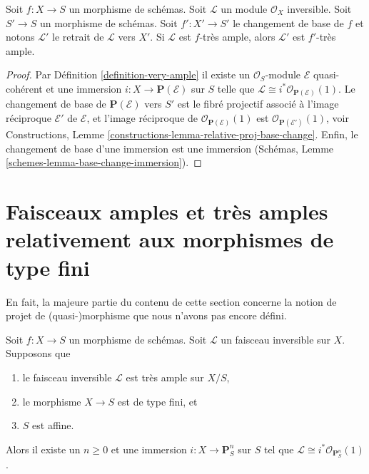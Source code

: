 \begin{lemma}
\label{lemma-very-ample-base-change}
Soit $f : X \to S$ un morphisme de schémas. Soit
$\mathcal{L}$ un module $\mathcal{O}_X$ inversible. Soit $S' \to S$
un morphisme de schémas. Soit $f' : X' \to S'$
le changement de base de $f$ et notons $\mathcal{L}'$
le retrait de $\mathcal{L}$ vers $X'$. Si $\mathcal{L}$
est $f$-très ample, alors $\mathcal{L}'$ est $f'$-très ample.
\end{lemma}

\begin{proof}
Par Définition \ref{definition-very-ample} il existe un $\mathcal{O}_S$-module
$\mathcal{E}$ quasi-cohérent et une
immersion $i : X \to \mathbf{P}(\mathcal{E})$ sur $S$
telle que $\mathcal{L} \cong i^*\mathcal{O}_{\mathbf{P}(\mathcal{E})}(1)$. Le changement de
base de $\mathbf{P}(\mathcal{E})$ vers $S'$
est le fibré projectif associé à l'image réciproque
$\mathcal{E}'$ de $\mathcal{E}$,
et l'image réciproque de $\mathcal{O}_{\mathbf{P}(\mathcal{E})}(1)$
est
$\mathcal{O}_{\mathbf{P}(\mathcal{E}')}(1)$, voir Constructions,
Lemme \ref{constructions-lemma-relative-proj-base-change}. Enfin, le changement
de base
d'une immersion est une
immersion (Schémas, Lemme \ref{schemes-lemma-base-change-immersion}).
\end{proof}







\section{Faisceaux amples et très amples relativement aux morphismes de type fini}
\label{section-ample-finite-type}

\noindent
En fait, la majeure partie du contenu de cette section concerne la notion de
projet de (quasi-)morphisme que nous n'avons pas encore défini.

\begin{lemma}
\label{lemma-very-ample-finite-type-over-affine}
Soit $f : X \to S$ un morphisme de schémas. Soit $\mathcal{L}$
un faisceau inversible sur $X$. Supposons
que
\begin{enumerate}
\item le faisceau inversible $\mathcal{L}$ est très ample sur $X/S$,
\item le morphisme $X \to S$ est de type fini, et
\item $S$ est affine.
\end{enumerate}
Alors il existe un $n \geq 0$
et une immersion $i : X \to \mathbf{P}^n_S$ sur
$S$ tel que $\mathcal{L} \cong i^*\mathcal{O}_{\mathbf{P}^n_S}(1)$.
\end{lemma}

